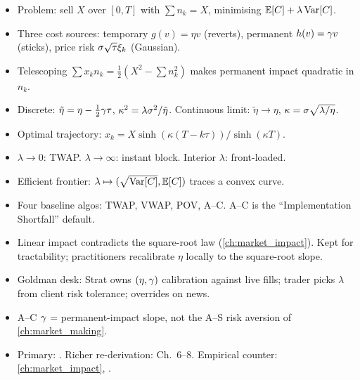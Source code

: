 \begin{itemize}
  \item Problem: sell $X$ over $[0,T]$ with $\sum n_k = X$,
  minimising $\mathbb{E}[C] + \lambda\operatorname{Var}[C]$.
  \item Three cost sources: temporary $g(v) = \eta v$ (reverts),
  permanent $h(v) = \gamma v$ (sticks), price risk
  $\sigma\sqrt\tau\xi_k$ (Gaussian).
  \item Telescoping $\sum x_k n_k = \tfrac{1}{2}(X^2 - \sum n_k^2)$
  makes permanent impact quadratic in $n_k$.
  \item Discrete: $\tilde\eta = \eta - \tfrac{1}{2}\gamma\tau$,
  $\kappa^2 = \lambda\sigma^2/\tilde\eta$. Continuous limit:
  $\tilde\eta \to \eta$, $\kappa = \sigma\sqrt{\lambda/\eta}$.
  \item Optimal trajectory: $x_k = X\sinh(\kappa(T - k\tau))/
  \sinh(\kappa T)$.
  \item $\lambda \to 0$: TWAP. $\lambda \to \infty$: instant
  block. Interior $\lambda$: front-loaded.
  \item Efficient frontier: $\lambda \mapsto (\sqrt{\operatorname{Var}[C]},
  \mathbb{E}[C])$ traces a convex curve.
  \item Four baseline algos: TWAP, VWAP, POV, A--C. A--C is the
  ``Implementation Shortfall'' default.
  \item Linear impact contradicts the square-root law
  (\cref{ch:market_impact}). Kept for tractability; practitioners
  recalibrate $\eta$ locally to the square-root slope.
  \item Goldman desk: Strat owns $(\eta, \gamma)$ calibration
  against live fills; trader picks $\lambda$ from client risk
  tolerance; overrides on news.
  \item A--C $\gamma$ = permanent-impact slope, not the A--S
  risk aversion of \cref{ch:market_making}.
  \item Primary: \citeAC{}. Richer re-derivation: \citeCartea{}
  Ch.~6--8. Empirical counter: \cref{ch:market_impact},
  \citeBouchaud{}.
\end{itemize}
